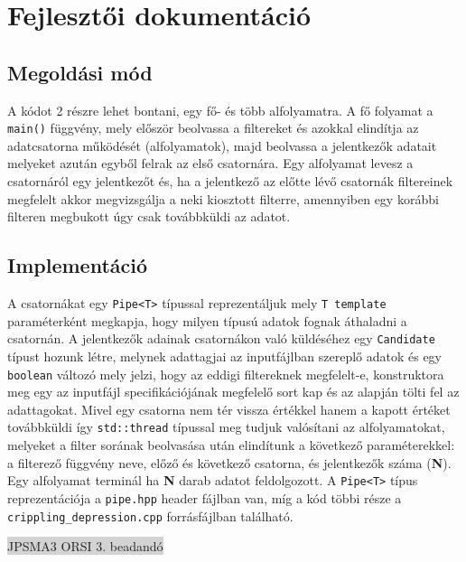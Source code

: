 \documentclass[12pt]{article}
\begin{document}
\section{Fejlesztői dokumentáció}

\subsection{Megoldási mód}

A kódot 2 részre lehet bontani, egy fő- és több alfolyamatra. A fő folyamat a \verb|main()|
függvény, mely először beolvassa a filtereket és azokkal elindítja az adatcsatorna működését
(alfolyamatok), majd beolvassa a jelentkezők adatait melyeket azután egyből felrak az első csatornára.\br
Egy alfolyamat levesz a csatornáról egy jelentkezőt és, ha a jelentkező az előtte lévő
csatornák filtereinek megfelelt akkor megvizsgálja a neki kiosztott filterre, amennyiben
egy korábbi filteren megbukott úgy csak továbbküldi az adatot.

\subsection{Implementáció}
A csatornákat egy \verb|Pipe<T>| típussal reprezentáljuk mely \verb|T template| paraméterként
megkapja, hogy milyen típusú adatok fognak áthaladni a csatornán.
A jelentkezők adainak csatornákon való küldéséhez egy \verb|Candidate| típust hozunk létre, 
melynek adattagjai az inputfájlban szereplő adatok és egy \verb|boolean| változó mely jelzi,
hogy az eddigi filtereknek megfelelt-e, konstruktora meg egy az inputfájl specifikációjának
megfelelő sort kap és az alapján tölti fel az adattagokat. Mivel egy csatorna nem tér vissza
értékkel hanem a kapott értéket továbbküldi így \verb|std::thread| típussal meg tudjuk
valósítani az alfolyamatokat, melyeket a filter sorának beolvasása után elindítunk
a következő paraméterekkel: a filterező függvény neve, előző és következő csatorna, és
jelentkezők száma (\textbf{N}). Egy alfolyamat terminál ha \textbf{N} darab adatot feldolgozott.
A \verb|Pipe<T>| típus reprezentációja a \verb|pipe.hpp| header fájlban van, míg a kód többi
része a \verb|crippling_depression.cpp| forrásfájlban található.

\newpage
\thispagestyle{empty}
\begin{center}
	\colorbox{lightgray}{{\large JPSMA3} \hspace{4.3cm} {\large ORSI 3. beadandó} \hspace{5.7cm} \thepage}
\end{center}
\end{document}
